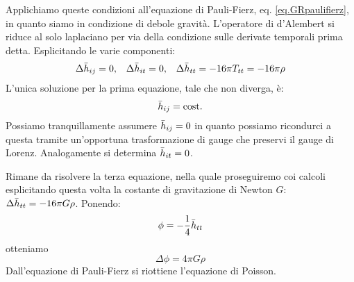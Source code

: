 Applichiamo queste condizioni all'equazione di Pauli-Fierz, eq. \ref{eq.GRpaulifierz}, in quanto siamo in condizione di debole gravità.
L'operatore di d'Alembert si riduce al solo laplaciano per via della condizione sulle derivate temporali prima detta. Esplicitando le varie componenti:
\begin{equation*}
    \begin{array}{ccc}
    \Delta\Bar{h}_{ij} = 0 ,& \Delta\Bar{h}_{it} = 0 ,& \Delta \Bar{h}_{tt} = -16\pi T_{tt}=-16\pi\rho
    \end{array}
\end{equation*}
L'unica soluzione per la prima equazione, tale che non diverga, è: 
\begin{equation*}
    \Bar{h}_{ij}= \textrm{cost.}
\end{equation*}
Possiamo tranquillamente assumere $\Bar{h}_{ij}=0$ in quanto possiamo ricondurci a questa tramite un'opportuna trasformazione di gauge che preservi il gauge di Lorenz. Analogamente si determina  $\Bar{h}_{it}=0$.

Rimane da risolvere la terza equazione, nella quale proseguiremo coi calcoli esplicitando questa volta la costante di gravitazione di Newton $G$: $\Delta\Bar{h}_{tt}=-16\pi G \rho$.
Ponendo:
\begin{equation}
    \phi = -\frac{1}{4}\Bar{h}_{tt}
    \label{eq.legamepotenziale_phi_e_h}
\end{equation}
otteniamo
\begin{equation*}
    \Delta \phi = 4\pi G\rho
\end{equation*}
Dall'equazione di Pauli-Fierz si riottiene l'equazione di Poisson.

